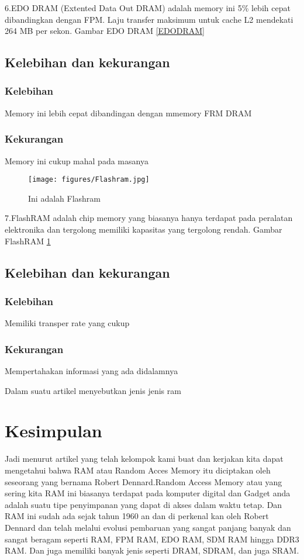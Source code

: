 6.EDO DRAM (Extented Data Out DRAM) adalah memory ini 5\% lebih cepat dibandingkan dengan FPM. Laju transfer maksimum untuk cache L2 mendekati 264 MB per sekon.
Gambar EDO DRAM \ref{EDODRAM}
  \subsection{Kelebihan dan kekurangan}
    \subsubsection{Kelebihan}
    \-Memory ini lebih cepat dibandingan dengan mmemory FRM DRAM
    \subsubsection{Kekurangan}
    \-Memory ini cukup mahal pada masanya


  \begin{figure}[ht]
  \centerline{\texttt{[image: figures/Flashram.jpg]}}
  \caption{Ini adalah Flashram}
  \label{Flashram}
  \end{figure}

7.FlashRAM adalah chip memory yang biasanya hanya terdapat pada peralatan elektronika dan tergolong memiliki kapasitas yang tergolong rendah.
Gambar FlashRAM \ref{Flashram}
  \subsection{Kelebihan dan kekurangan}
    \subsubsection{Kelebihan}
    \-Memiliki transper rate yang cukup
    \subsubsection{Kekurangan}
    \-Mempertahakan informasi yang ada didalamnya

Dalam suatu artikel menyebutkan jenis \- jenis ram \cite{bruce1999unified}

\section{Kesimpulan}
Jadi menurut artikel yang telah kelompok kami buat dan kerjakan kita dapat mengetahui bahwa RAM atau Random Acces Memory itu diciptakan oleh seseorang yang bernama Robert Dennard.Random Access Memory atau yang sering kita RAM ini biasanya terdapat pada komputer digital dan Gadget anda adalah suatu tipe penyimpanan yang dapat di akses dalam waktu tetap. Dan RAM ini sudah ada sejak tahun 1960 an dan di perkenal kan oleh Robert Dennard dan telah melalui evolusi pembaruan yang sangat panjang banyak dan sangat beragam seperti RAM, FPM RAM, EDO RAM, SDM RAM hingga DDR3 RAM. Dan juga memiliki banyak jenis seperti DRAM, SDRAM, dan juga SRAM.

